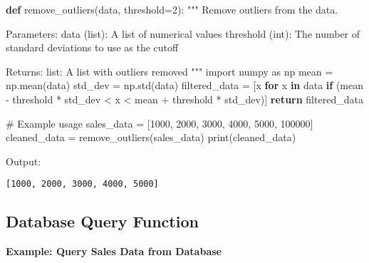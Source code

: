 \documentclass[
  letterpaper,
  DIV=11,
  numbers=noendperiod]{scrreprt}
\newenvironment{Shaded}{\begin{snugshade}}{\end{snugshade}}
\newcommand{\BuiltInTok}[1]{\textcolor[rgb]{0.00,0.23,0.31}{#1}}
\newcommand{\CommentTok}[1]{\textcolor[rgb]{0.37,0.37,0.37}{#1}}
\newcommand{\ControlFlowTok}[1]{\textcolor[rgb]{0.00,0.23,0.31}{\textbf{#1}}}
\newcommand{\DecValTok}[1]{\textcolor[rgb]{0.68,0.00,0.00}{#1}}
\newcommand{\ImportTok}[1]{\textcolor[rgb]{0.00,0.46,0.62}{#1}}
\newcommand{\KeywordTok}[1]{\textcolor[rgb]{0.00,0.23,0.31}{\textbf{#1}}}
\newcommand{\NormalTok}[1]{\textcolor[rgb]{0.00,0.23,0.31}{#1}}
\newcommand{\OperatorTok}[1]{\textcolor[rgb]{0.37,0.37,0.37}{#1}}
\begin{document}
\begin{Shaded}
\begin{Highlighting}[]
\KeywordTok{def}\NormalTok{ remove\_outliers(data, threshold}\OperatorTok{=}\DecValTok{2}\NormalTok{):}
    \CommentTok{"""}
\CommentTok{    Remove outliers from the data.}

\CommentTok{    Parameters:}
\CommentTok{    data (list): A list of numerical values}
\CommentTok{    threshold (int): The number of standard deviations to use as the cutoff}

\CommentTok{    Returns:}
\CommentTok{    list: A list with outliers removed}
\CommentTok{    """}
    \ImportTok{import}\NormalTok{ numpy }\ImportTok{as}\NormalTok{ np}
\NormalTok{    mean }\OperatorTok{=}\NormalTok{ np.mean(data)}
\NormalTok{    std\_dev }\OperatorTok{=}\NormalTok{ np.std(data)}
\NormalTok{    filtered\_data }\OperatorTok{=}\NormalTok{ [x }\ControlFlowTok{for}\NormalTok{ x }\KeywordTok{in}\NormalTok{ data }\ControlFlowTok{if}\NormalTok{ (mean }\OperatorTok{{-}}\NormalTok{ threshold }\OperatorTok{*}\NormalTok{ std\_dev }\OperatorTok{\textless{}}\NormalTok{ x }\OperatorTok{\textless{}}\NormalTok{ mean }\OperatorTok{+}\NormalTok{ threshold }\OperatorTok{*}\NormalTok{ std\_dev)]}
    \ControlFlowTok{return}\NormalTok{ filtered\_data}

\CommentTok{\# Example usage}
\NormalTok{sales\_data }\OperatorTok{=}\NormalTok{ [}\DecValTok{1000}\NormalTok{, }\DecValTok{2000}\NormalTok{, }\DecValTok{3000}\NormalTok{, }\DecValTok{4000}\NormalTok{, }\DecValTok{5000}\NormalTok{, }\DecValTok{100000}\NormalTok{]}
\NormalTok{cleaned\_data }\OperatorTok{=}\NormalTok{ remove\_outliers(sales\_data)}
\BuiltInTok{print}\NormalTok{(cleaned\_data)}
\end{Highlighting}
\end{Shaded}

Output:

\begin{verbatim}
[1000, 2000, 3000, 4000, 5000]
\end{verbatim}

\subsection{Database Query Function}\label{database-query-function}

\textbf{Example: Query Sales Data from Database}
\end{document}
